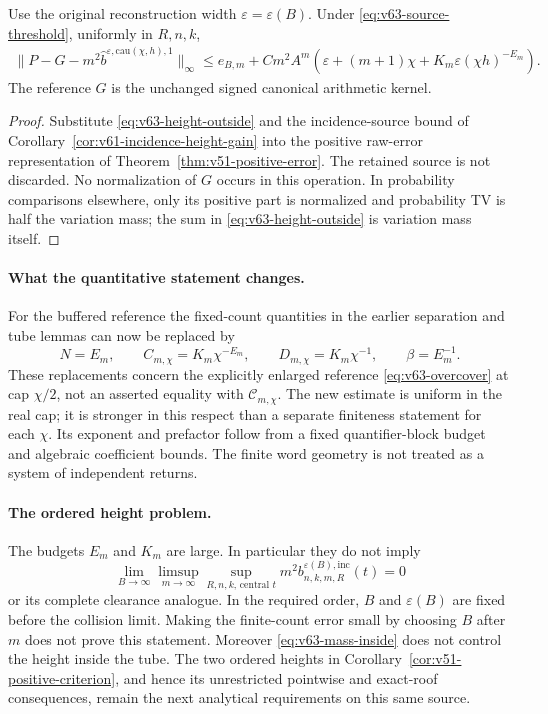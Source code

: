 \begin{corollary}
\label{cor:v63-effective-raw-error}
Use the original reconstruction width $\varepsilon=\varepsilon(B)$.
Under \eqref{eq:v63-source-threshold}, uniformly in $R,n,k$,
\begin{align}\label{eq:v63-effective-raw-error}
 \|P-G-m^2\widehat b^{\varepsilon,\mathrm{cau}(\chi,h),1}\|_\infty
 \le e_{B,m}+Cm^2A^m\left(\varepsilon+(m+1)\chi+
                     K_m\varepsilon(\chi h)^{-E_m}\right).
\end{align}
The reference $G$ is the unchanged signed canonical arithmetic kernel.
\end{corollary}
\begin{proof}
Substitute \eqref{eq:v63-height-outside} and the incidence-source
bound of Corollary~\ref{cor:v61-incidence-height-gain} into the positive
raw-error representation of Theorem~\ref{thm:v51-positive-error}.
The retained source is not discarded. No normalization of $G$ occurs
in this operation. In probability comparisons elsewhere, only its
positive part is normalized and probability TV is half the variation
mass; the sum in \eqref{eq:v63-height-outside} is variation mass itself.
\end{proof}

\paragraph{What the quantitative statement changes.}
For the buffered reference the fixed-count quantities in the earlier
separation and tube lemmas can now be replaced by
\[
 N=E_m,\qquad C_{m,\chi}=K_m\chi^{-E_m},\qquad
 D_{m,\chi}=K_m\chi^{-1},\qquad \beta=E_m^{-1}.
\]
These replacements concern the explicitly enlarged reference
\eqref{eq:v63-overcover} at cap $\chi/2$, not an asserted equality with
$\mathcal C_{m,\chi}$. The new estimate is uniform in the real cap;
it is stronger in this respect than a separate finiteness statement
for each $\chi$. Its exponent and prefactor follow from a fixed
quantifier-block budget and algebraic coefficient bounds. The finite
word geometry is not treated as a system of independent returns.

\paragraph{The ordered height problem.}
The budgets $E_m$ and $K_m$ are large. In particular they do not imply
\[
 \lim_{B\to\infty}\limsup_{m\to\infty}
 \sup_{R,n,k,\,\text{central }t}
        m^2b^{\varepsilon(B),\mathrm{inc}}_{n,k,m,R}(t)=0
\]
or its complete clearance analogue. In the required order, $B$ and
$\varepsilon(B)$ are fixed before the collision limit. Making the
finite-count error small by choosing $B$ after $m$ does not prove this
statement. Moreover \eqref{eq:v63-mass-inside} does not control the
height inside the tube. The two ordered heights in
Corollary~\ref{cor:v51-positive-criterion}, and hence its unrestricted
pointwise and exact-roof consequences, remain the next analytical
requirements on this same source.

